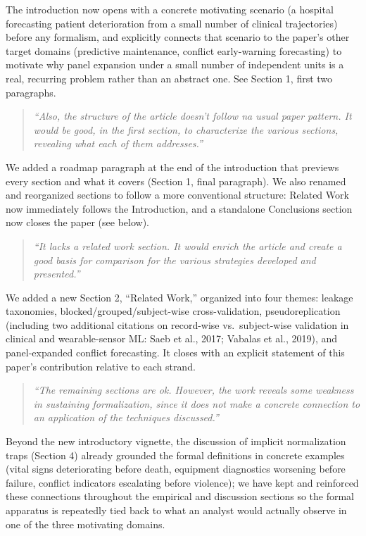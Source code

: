\documentclass[11pt]{article}
\newcommand{\rc}[1]{\textit{``#1''}}
\newenvironment{response}{\begin{quote}\color{black}}{\end{quote}}
\begin{document}
The introduction now opens with a concrete motivating scenario (a hospital forecasting patient deterioration from a small number of clinical trajectories) before any formalism, and explicitly connects that scenario to the paper's other target domains (predictive maintenance, conflict early-warning forecasting) to motivate why panel expansion under a small number of independent units is a real, recurring problem rather than an abstract one. See Section 1, first two paragraphs.

\begin{response}
\rc{Also, the structure of the article doesn't follow na usual paper pattern. It would be good, in the first section, to characterize the various sections, revealing what each of them addresses.}
\end{response}

We added a roadmap paragraph at the end of the introduction that previews every section and what it covers (Section 1, final paragraph). We also renamed and reorganized sections to follow a more conventional structure: Related Work now immediately follows the Introduction, and a standalone Conclusions section now closes the paper (see below).

\begin{response}
\rc{It lacks a related work section. It would enrich the article and create a good basis for comparison for the various strategies developed and presented.}
\end{response}

We added a new Section 2, ``Related Work,'' organized into four themes: leakage taxonomies, blocked/grouped/subject-wise cross-validation, pseudoreplication (including two additional citations on record-wise vs.\ subject-wise validation in clinical and wearable-sensor ML: Saeb et al., 2017; Vabalas et al., 2019), and panel-expanded conflict forecasting. It closes with an explicit statement of this paper's contribution relative to each strand.

\begin{response}
\rc{The remaining sections are ok. However, the work reveals some weakness in sustaining formalization, since it does not make a concrete connection to an application of the techniques discussed.}
\end{response}

Beyond the new introductory vignette, the discussion of implicit normalization traps (Section 4) already grounded the formal definitions in concrete examples (vital signs deteriorating before death, equipment diagnostics worsening before failure, conflict indicators escalating before violence); we have kept and reinforced these connections throughout the empirical and discussion sections so the formal apparatus is repeatedly tied back to what an analyst would actually observe in one of the three motivating domains.
\end{document}
